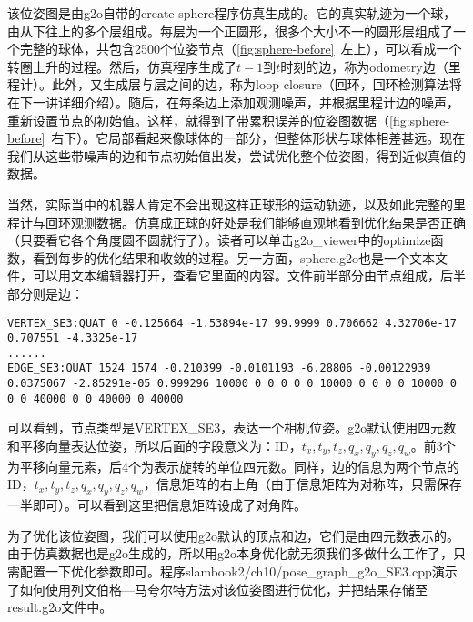 该位姿图是由g2o自带的create sphere程序仿真生成的。它的真实轨迹为一个球，由从下往上的多个层组成。每层为一个正圆形，很多个大小不一的圆形层组成了一个完整的球体，共包含2500个位姿节点（\autoref{fig:sphere-before}~左上），可以看成一个转圈上升的过程。然后，仿真程序生成了$t-1$到$t$时刻的边，称为odometry边（里程计）。此外，又生成层与层之间的边，称为loop closure（回环，回环检测算法将在下一讲详细介绍）。随后，在每条边上添加观测噪声，并根据里程计边的噪声，重新设置节点的初始值。这样，就得到了带累积误差的位姿图数据（\autoref{fig:sphere-before}~右下）。它局部看起来像球体的一部分，但整体形状与球体相差甚远。现在我们从这些带噪声的边和节点初始值出发，尝试优化整个位姿图，得到近似真值的数据。

当然，实际当中的机器人肯定不会出现这样正球形的运动轨迹，以及如此完整的里程计与回环观测数据。仿真成正球的好处是我们能够直观地看到优化结果是否正确（只要看它各个角度圆不圆就行了）。读者可以单击g2o\_viewer中的optimize函数，看到每步的优化结果和收敛的过程。另一方面，sphere.g2o也是一个文本文件，可以用文本编辑器打开，查看它里面的内容。文件前半部分由节点组成，后半部分则是边：

\begin{lstlisting}
VERTEX_SE3:QUAT 0 -0.125664 -1.53894e-17 99.9999 0.706662 4.32706e-17 0.707551 -4.3325e-17 
......
EDGE_SE3:QUAT 1524 1574 -0.210399 -0.0101193 -6.28806 -0.00122939 0.0375067 -2.85291e-05 0.999296 10000 0 0 0 0 0 10000 0 0 0 0 10000 0 0 0 40000 0 0 40000 0 40000 
\end{lstlisting}

可以看到，节点类型是VERTEX\_SE3，表达一个相机位姿。g2o默认使用四元数和平移向量表达位姿，所以后面的字段意义为：ID，$t_x, t_y, t_z, q_x, q_y, q_z, q_w$。前3个为平移向量元素，后4个为表示旋转的单位四元数。同样，边的信息为两个节点的ID，$t_x, t_y, t_z, q_x, q_y, q_z, q_w$，信息矩阵的右上角（由于信息矩阵为对称阵，只需保存一半即可）。可以看到这里把信息矩阵设成了对角阵。

为了优化该位姿图，我们可以使用g2o默认的顶点和边，它们是由四元数表示的。由于仿真数据也是g2o生成的，所以用g2o本身优化就无须我们多做什么工作了，只需配置一下优化参数即可。程序slambook2/ch10/pose\_graph\_g2o\_SE3.cpp演示了如何使用列文伯格—马夸尔特方法对该位姿图进行优化，并把结果存储至result.g2o文件中。

